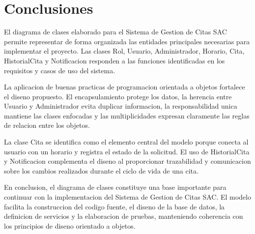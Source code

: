 \documentclass[12pt,letterpaper]{article}
\begin{document}
\section{Conclusiones}

El diagrama de clases elaborado para el Sistema de Gestion de Citas SAC permite representar de forma organizada las entidades principales necesarias para implementar el proyecto. Las clases Rol, Usuario, Administrador, Horario, Cita, HistorialCita y Notificacion responden a las funciones identificadas en los requisitos y casos de uso del sistema.

La aplicacion de buenas practicas de programacion orientada a objetos fortalece el diseno propuesto. El encapsulamiento protege los datos, la herencia entre Usuario y Administrador evita duplicar informacion, la responsabilidad unica mantiene las clases enfocadas y las multiplicidades expresan claramente las reglas de relacion entre los objetos.

La clase Cita se identifica como el elemento central del modelo porque conecta al usuario con un horario y registra el estado de la solicitud. El uso de HistorialCita y Notificacion complementa el diseno al proporcionar trazabilidad y comunicacion sobre los cambios realizados durante el ciclo de vida de una cita.

En conclusion, el diagrama de clases constituye una base importante para continuar con la implementacion del Sistema de Gestion de Citas SAC. El modelo facilita la construccion del codigo fuente, el diseno de la base de datos, la definicion de servicios y la elaboracion de pruebas, manteniendo coherencia con los principios de diseno orientado a objetos.
\end{document}
